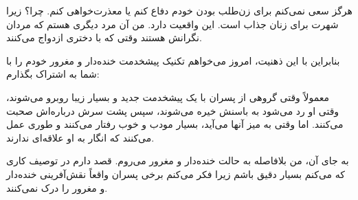 هرگز سعی نمی‌کنم برای زن‌طلب بودن خودم دفاع کنم یا معذرت‌خواهی کنم. چرا؟  
زیرا شهرت برای زنان جذاب است. این واقعیت دارد. من آن مرد دیگری هستم که مردان نگرانش هستند وقتی که با دختری ازدواج می‌کنند.

بنابراین با این ذهنیت، امروز می‌خواهم تکنیک پیشخدمت خنده‌دار و مغرور خودم را با شما به اشتراک بگذارم:

معمولاً وقتی گروهی از پسران با یک پیشخدمت جدید و بسیار زیبا روبرو می‌شوند، وقتی او رد می‌شود به باسنش خیره می‌شوند، سپس پشت سرش درباره‌اش صحبت می‌کنند. اما وقتی به میز آنها می‌آید، بسیار مودب و خوب رفتار می‌کنند و طوری عمل می‌کنند که انگار به او علاقه‌ای ندارند.

به جای آن، من بلافاصله به حالت خنده‌دار و مغرور می‌روم. قصد دارم در توصیف کاری که می‌کنم بسیار دقیق باشم زیرا فکر می‌کنم برخی پسران واقعاً نقش‌آفرینی خنده‌دار و مغرور را درک نمی‌کنند.